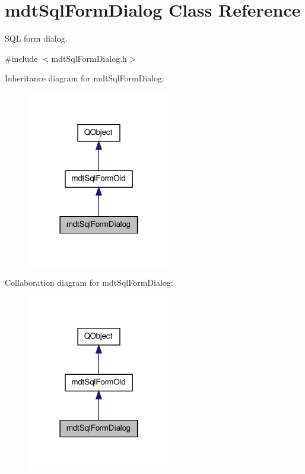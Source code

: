 \hypertarget{classmdt_sql_form_dialog}{\section{mdt\-Sql\-Form\-Dialog Class Reference}
\label{classmdt_sql_form_dialog}
}


S\-Q\-L form dialog.  




{\ttfamily \#include $<$mdt\-Sql\-Form\-Dialog.\-h$>$}



Inheritance diagram for mdt\-Sql\-Form\-Dialog\-:\nopagebreak
\begin{figure}[H]
\begin{center}
\leavevmode
\includegraphics[width=178pt]{classmdt_sql_form_dialog__inherit__graph}
\end{center}
\end{figure}


Collaboration diagram for mdt\-Sql\-Form\-Dialog\-:\nopagebreak
\begin{figure}[H]
\begin{center}
\leavevmode
\includegraphics[width=178pt]{classmdt_sql_form_dialog__coll__graph}
\end{center}
\end{figure}
